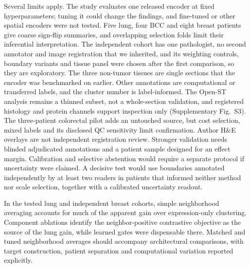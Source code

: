 Several limits apply. The study evaluates one released encoder at fixed hyperparameters; tuning it could change the findings, and fine-tuned or other spatial encoders were not tested. Five lung, four BCC and eight breast patients give coarse sign-flip summaries, and overlapping selection folds limit their inferential interpretation. The independent cohort has one pathologist, no second annotator and image registration that we inherited, and its weighting controls, boundary variants and tissue panel were chosen after the first comparison, so they are exploratory. The three non-tumor tissues are single sections that the encoder was benchmarked on earlier. Other annotations are computational or transferred labels, and the cluster number is label-informed. The Open-ST analysis remains a thinned subset, not a whole-section validation, and registered histology and protein channels support inspection only (Supplementary Fig.~S3). The three-patient colorectal pilot adds an untouched source, but cost selection, mixed labels and its disclosed QC sensitivity limit confirmation. Author H\&E overlays are not independent registration review. Stronger validation needs blinded adjudicated annotations and a patient sample designed for an effect margin. Calibration and selective abstention would require a separate protocol if uncertainty were claimed. A decisive test would use boundaries annotated independently by at least two readers in patients that informed neither method nor scale selection, together with a calibrated uncertainty readout.

In the tested lung and independent breast cohorts, simple neighborhood averaging accounts for much of the apparent gain over expression-only clustering. Component ablations identify the neighbor-positive contrastive objective as the source of the lung gain, while learned gates were dispensable there. Matched and tuned neighborhood averages should accompany architectural comparisons, with target construction, patient separation and computational variation reported explicitly.

